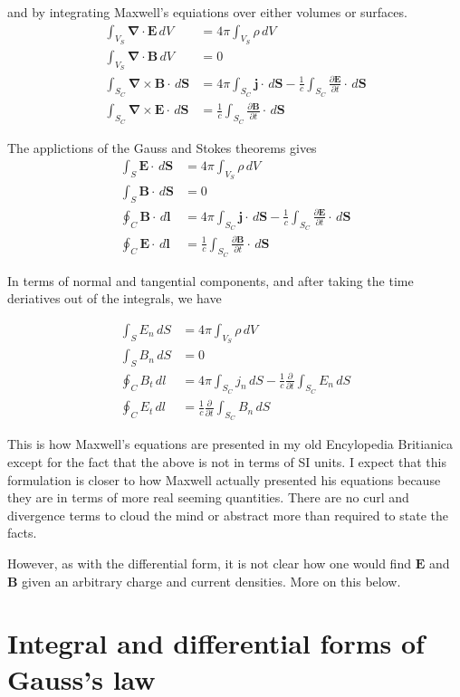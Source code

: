 \documentclass{article}      %
\newcommand{\grad}[0]{\boldsymbol{\nabla}}
\newcommand{\curl}[0]{\grad \times}
\newcommand{\diverg}[0]{\grad \cdot}
\newcommand{\D}[2] {\frac {\partial #2} {\partial #1}}
\newcommand{\Bj}[0]{\mathbf{j}}
\newcommand{\BB}[0]{\mathbf{B}}
\newcommand{\BE}[0]{\mathbf{E}}
\newcommand{\BS}[0]{\mathbf{S}}
\begin{document}
and by integrating Maxwell's equiations over either volumes or surfaces.
\begin{align*}
\int_{V_S} \diverg \BE \, dV &= 4\pi \int_{V_S} \rho\, dV \\
\int_{V_S} \diverg \BB \, dV &= 0 \\
\int_{S_C} \curl \BB \cdot \, d\BS &= 4\pi \int_{S_C} \Bj \cdot \, d\BS - \frac{1}{c} \int_{S_C} \D{t}{\BE} \cdot \, d\BS \\
\int_{S_C} \curl \BE \cdot \, d\BS &= \frac{1}{c} \int_{S_C} \D{t}{\BB} \cdot \, d\BS
\end{align*}

The applictions of the Gauss and Stokes theorems gives
\begin{align*}
\int_{S} \BE \cdot \, d\BS &= 4\pi \int_{V_S} \rho\, dV \\
\int_{S} \BB \cdot \, d\BS &= 0 \\
\oint_{C} \BB \cdot \, d\mathbf{l} &= 4\pi \int_{S_C} \Bj \cdot \, d\BS - \frac{1}{c} \int_{S_C} \D{t}{\BE} \cdot \, d\BS \\
\oint_{C} \BE \cdot \, d\mathbf{l} &= \frac{1}{c} \int_{S_C} \D{t}{\BB} \cdot \, d\BS
\end{align*}

In terms of normal and tangential components, and after taking the time 
deriatives out of the integrals, we have

\begin{align*}
\int_{S} E_n \, dS &= 4\pi \int_{V_S} \rho\, dV \\
\int_{S} B_n \, dS &= 0 \\
\oint_{C} B_t \, dl &= 4\pi \int_{S_C} j_n \, dS - \frac{1}{c} \D{t}{} \int_{S_C} E_n \, dS \\
\oint_{C} E_t \, dl &= \frac{1}{c} \D{t}{} \int_{S_C} B_n \, dS
\end{align*}

This is how 
Maxwell's equations are presented in my old 
Encylopedia Britianica 
except for the fact that 
the above is not in terms of SI units.  I expect that this formulation is closer to how 
Maxwell actually presented his equations because they are in terms of more real 
seeming quantities.  There are no curl and divergence terms to cloud the mind or
abstract more than required to state the facts.

However, as with the differential form, it is not clear how one would find
$\BE$ and $\BB$ given an arbitrary charge and current densities.  More on 
this below.

\section{Integral and differential forms of Gauss's law}
\end{document}
